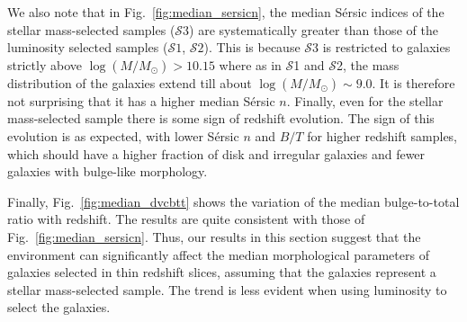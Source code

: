 \documentclass[twocolumn,useAMS,usenatbib]{mn2e}
\newcommand{\sersic}{S\'{e}rsic }
\newcommand{\s}{\ensuremath{\mathcal{S}}}
\begin{document}
We also note that in Fig.~\ref{fig:median_sersicn}, the median \sersic
indices of the stellar mass-selected samples (\s$3$) are
systematically greater than those of the luminosity selected samples
(\s$1$, \s$2$).  
This is because \s3 is restricted to galaxies strictly above $\log(M/M_\odot) > 10.15$ where as in \s1 and \s2, the mass distribution of the galaxies extend till about $\log(M/M_\odot) \sim 9.0$.
It is therefore not surprising that it has a higher median \sersic $n$.  Finally, even for
the stellar mass-selected sample there is some sign of redshift
evolution.  The sign of this evolution is as expected, with lower
\sersic $n$ and $B/T$ for higher redshift samples, which should have a
higher fraction of disk and irregular galaxies and fewer galaxies with
bulge-like morphology.
 
Finally, Fig.~\ref{fig:median_dvcbtt} shows the variation of the median
bulge-to-total ratio with redshift. The results are quite consistent
with those of Fig.~\ref{fig:median_sersicn}. 
Thus, our results in this section suggest that the 
environment can significantly affect the median morphological
parameters of galaxies selected in thin redshift
slices, assuming that the galaxies represent a stellar mass-selected
sample.  The trend is less evident when using luminosity to select the
galaxies.
\end{document}
